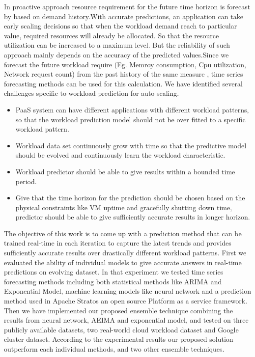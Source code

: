 In proactive approach resource requirement for the future time horizon is forecast by based on demand history.With accurate predictions, an application can take early scaling decisions so that when the workload demand reach to particular value, required resources will already be allocated. So that the resource  utilization can be increased to a maximum level. But the reliability of such approach mainly depends on the accuracy of the predicted values.Since we forecast the future workload require (Eg. Memroy consumption, Cpu utilization, Network request count) from the past history of the same measure , time series forecasting methods can be used for this calculation. 
We have identified several challenges specific to workload prediction for auto scaling.
\begin{itemize}
\item PaaS system can have different applications with different workload patterns, so that the workload prediction model should not be over fitted to a specific workload pattern.
\item Workload data set continuously grow with time so that the predictive model should be evolved and continuously learn the workload characteristic. 
\item Workload predictor should be able to give results within a bounded time period.
\item Give that the  time horizon for the prediction should be chosen based on the physical constraints like VM uptime and gracefully shutting down time, predictor should be able to give sufficiently accurate results in longer horizon.
\end{itemize}

The objective of this work is to come up with a prediction method that can be trained real-time in each iteration to capture the latest trends and provides sufficiently accurate results over drastically different workload patterns. First we evaluated the ability of individual models to give accurate answers in real-time predictions on evolving dataset. In that experiment we tested time series forecasting methods including both statistical methods like ARIMA and Exponential Model, machine learning models like neural network and a prediction method used in Apache Stratos an open source Platform as a service framework. Then we have implemented our proposed ensemble technique combining the results from neural network, AEIMA and exponential model, and tested on three publicly available datasets, two real-world cloud workload dataset and Google cluster dataset. According to the experimental results our proposed solution outperform each individual methods, and two other ensemble techniques.

